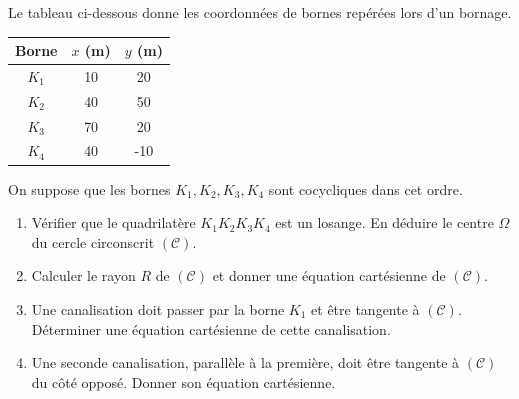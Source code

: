 \documentclass[11pt]{article}
\begin{document}
\begin{exercice}
Le tableau ci-dessous donne les coordonnées de bornes repérées lors d'un bornage.
\begin{center}
\begin{tabular}{|c|c|c|}
\hline
Borne & $x$ (m) & $y$ (m) \\
\hline
$K_1$ & 10 & 20 \\
$K_2$ & 40 & 50 \\
$K_3$ & 70 & 20 \\
$K_4$ & 40 & -10 \\
\hline
\end{tabular}
\end{center}
On suppose que les bornes $K_1, K_2, K_3, K_4$ sont cocycliques dans cet ordre.
\begin{enumerate}
    \item Vérifier que le quadrilatère $K_1K_2K_3K_4$ est un losange. En déduire le centre $\Omega$ du cercle circonscrit $(\mathcal{C})$.
    \item Calculer le rayon $R$ de $(\mathcal{C})$ et donner une équation cartésienne de $(\mathcal{C})$.
    \item Une canalisation doit passer par la borne $K_1$ et être tangente à $(\mathcal{C})$. 
    Déterminer une équation cartésienne de cette canalisation.
    \item Une seconde canalisation, parallèle à la première, doit être tangente à $(\mathcal{C})$ du côté opposé. 
    Donner son équation cartésienne.
\end{enumerate}
\end{exercice}
\end{document}
